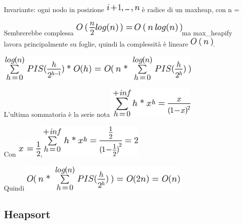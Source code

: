 \documentclass{article}
\begin{document}
{{}

{Invariante: ogni nodo in posizione \includegraphics{images/image130.png} è radice di un maxheap, con n = }

{}

{Sembrerebbe complessa }\includegraphics{images/image131.png}{ma max\_heapify lavora principalmente su foglie, }{quindi la complessità è lineare }\includegraphics{images/image132.png}{.}

{}

\includegraphics{images/image133.png}

{L'ultima sommatoria è la serie nota}\includegraphics{images/image134.png}

{Con }\includegraphics{images/image135.png}{,}\includegraphics{images/image136.png}

{Quindi }\includegraphics{images/image137.png}

\hypertarget{h.vi4eu8p6i55e}{\subsection{\texorpdfstring{{Heapsort}}{Heapsort}}\label{h.vi4eu8p6i55e}}

\protect\hypertarget{t.6067bda8a5da2e84ade010bd50161a2ed3d5c2cd}{}{}\protect\hypertarget{t.18}{}{}

}
\end{document}
